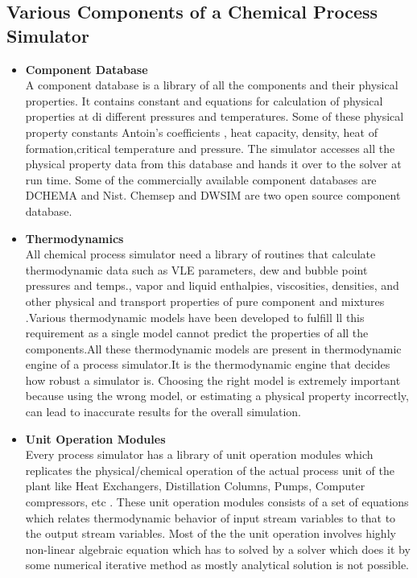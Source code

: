 \documentclass[12pt]{report}
\begin{document}
\subsection{Various Components of a Chemical Process Simulator}
\begin{itemize}
\item{\textbf{Component Database}} \\
A component database is a library of all the components and their physical properties. It contains constant and equations for calculation of physical properties at di different pressures and temperatures. Some of these physical property constants Antoin's coefficients  , heat capacity, density, heat of formation,critical temperature and pressure. The simulator accesses all the physical property data from this database and hands it over to the solver at run time. Some of the commercially available component databases are DCHEMA and Nist. Chemsep and DWSIM are two open source component database.

\item{\textbf{Thermodynamics}} \\
All chemical process simulator need a library of routines that calculate thermodynamic data such as VLE parameters, dew and bubble point pressures and temps., vapor and liquid enthalpies, viscosities, densities, and other physical and transport properties of pure component and mixtures .Various thermodynamic models have been developed to fulfill ll this requirement as a single model cannot predict the properties of all the components.All these thermodynamic models are present in thermodynamic engine of a process simulator.It is the thermodynamic engine that decides how robust a simulator is. Choosing the right model is extremely important because using the wrong model, or estimating a physical property incorrectly, can lead to inaccurate results for the overall simulation.

\item{\textbf{Unit Operation Modules}} \\
Every process simulator has a library of unit operation modules which replicates the physical/chemical operation of the actual process unit of the plant like Heat Exchangers, Distillation Columns, Pumps, Computer compressors, etc . These unit operation modules consists of a set of equations which relates thermodynamic behavior of input stream variables to that to the output stream variables. Most of the the unit operation involves highly non-linear algebraic equation which has to solved by
a solver which does it by some numerical iterative method as mostly analytical solution is not possible.


\end{itemize}
\end{document}
